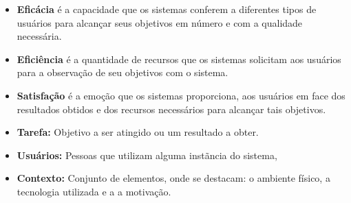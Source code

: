\begin{itemize}
\item \textbf{Eficácia} é a capacidade que os sistemas conferem a diferentes tipos de usuários para alcançar seus objetivos em número e com a qualidade necessária. 

\item \textbf{Eficiência} é a quantidade de recursos que os sistemas solicitam aos usuários para a observação de seu objetivos com o sistema.

\item \textbf{Satisfação} é a emoção que os sistemas proporciona, aos usuários em face dos resultados obtidos e dos recursos necessários para alcançar tais objetivos. 

\item \textbf{Tarefa:} Objetivo a ser atingido ou um resultado a obter.

\item \textbf{Usuários:} Pessoas que utilizam alguma instãncia do sistema,

\item \textbf{Contexto:} Conjunto de elementos, onde se destacam: o ambiente físico, a tecnologia utilizada e a a motivação.
\end{itemize}

